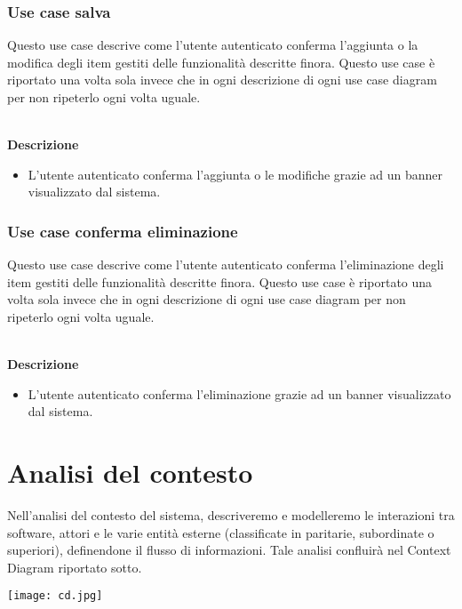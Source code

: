 \documentclass[a4paper,12pt]{article}
\begin{document}
\subsubsection*{Use case salva}

 Questo use case descrive come l'utente autenticato conferma l'aggiunta o la modifica degli item gestiti delle funzionalità descritte finora.
 Questo use case è riportato una volta sola invece che in ogni descrizione di ogni use case diagram per non ripeterlo ogni volta uguale. 
 
\textbf{\\Descrizione}
\begin{itemize} \setlength\itemsep{0.01em}
\item L'utente autenticato conferma l'aggiunta o le modifiche grazie ad un banner visualizzato dal sistema.
\end{itemize}




\subsubsection*{Use case conferma eliminazione}

 Questo use case descrive come l'utente autenticato conferma l'eliminazione degli item gestiti delle funzionalità descritte finora.
 Questo use case è riportato una volta sola invece che in ogni descrizione di ogni use case diagram per non ripeterlo ogni volta uguale. 
 
\textbf{\\Descrizione}
\begin{itemize} \setlength\itemsep{0.01em}
\item L'utente autenticato conferma l'eliminazione grazie ad un banner visualizzato dal sistema.
\end{itemize}




\newpage
\section*{Analisi del contesto}
Nell'analisi del contesto del sistema, descriveremo e modelleremo le interazioni tra software, attori e le varie entità esterne (classificate in paritarie, subordinate o superiori), definendone il flusso di informazioni. Tale analisi confluirà nel Context Diagram riportato sotto.

\begin{center}
  \texttt{[image: cd.jpg]}
\end{center}
\end{document}
